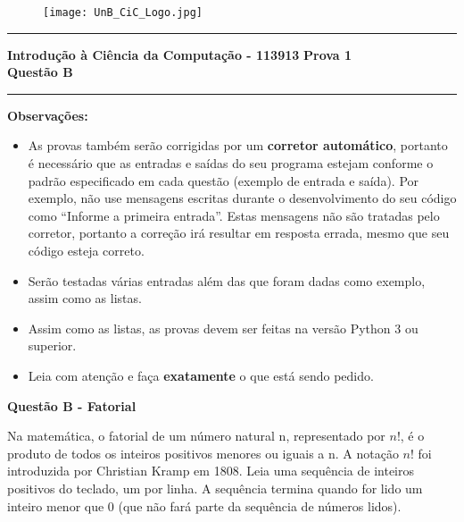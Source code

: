 \documentclass[a4paper, 12pt]{article}
\begin{document}
\begin{figure}[H]
	\texttt{[image: UnB\_CiC\_Logo.jpg]}
\end{figure}
\noindent\rule{\textwidth}{0.4pt}
\begin{center}
	\textbf{{\Large Introdução à Ciência da Computação - 113913}} \newline \newline
	\textbf{{\large Prova 1} \\
	\vspace{9pt}
	{\large Questão B}} \\
	\noindent\rule{\textwidth}{0.4pt}
	\newline
\end{center}

\textbf{{\large Observações:}}
\begin{itemize}
	\item As provas também serão corrigidas por um \textbf{corretor automático}, portanto é necessário que as entradas e saídas do seu programa estejam conforme o padrão especificado em cada questão (exemplo de entrada e saída). Por exemplo, não use mensagens escritas durante o desenvolvimento do seu código como “Informe a primeira entrada”. Estas mensagens não são tratadas pelo corretor, portanto a correção irá resultar em resposta errada, mesmo que seu código esteja correto.
	\item Serão testadas várias entradas além das que foram dadas como exemplo, assim como as listas.
	\item Assim como as listas, as provas devem ser feitas na versão Python 3 ou superior.
	\item Leia com atenção e faça \textbf{exatamente} o que está sendo pedido.
\end{itemize}
\newpage %
\begin{center}
\textbf{{\Large Questão B - Fatorial}}
\end{center}
\vspace{5pt}
Na matemática, o fatorial de um número natural n, representado por $n!$, é o produto de todos os inteiros positivos menores ou iguais a n. A notação $n!$ foi introduzida por Christian Kramp em 1808. \newline \newline Leia uma sequência de inteiros positivos do teclado, um por linha. A sequência termina quando for lido um inteiro menor que 0 (que não fará parte da sequência de números lidos).
\newline \newline
\end{document}
